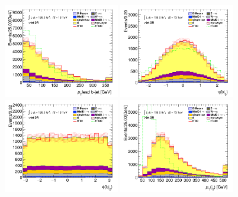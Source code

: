 		\begin{figure}[!htp]
			\begin{center}    
			\includegraphics[width=0.45\textwidth]{chapters/chapter6_HPlus/images/taujets/bjet_0_pt_SR_TAUJET.png}
			\includegraphics[width=0.45\textwidth]{chapters/chapter6_HPlus/images/taujets/bjet_0_eta_SR_TAUJET.png} \\
			\includegraphics[width=0.45\textwidth]{chapters/chapter6_HPlus/images/taujets/bjet_0_phi_SR_TAUJET.png}
			\includegraphics[width=0.45\textwidth]{chapters/chapter6_HPlus/images/taujets/jet_0_pt_SR_TAUJET.png} \\

\end{center}
\end{figure}
